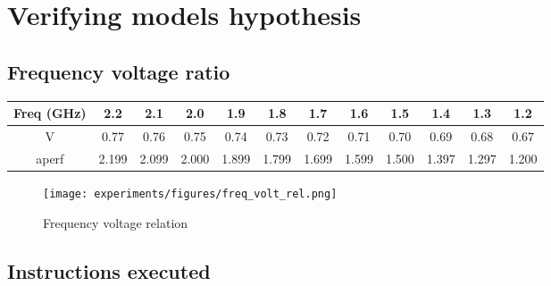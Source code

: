 \section{Verifying models hypothesis}

\subsection{Frequency voltage ratio}

\begin{table}[H]
	\begin{tabular}{|c|c|c|c|c|c|c|c|c|c|c|c|}
		\hline
		Freq (GHz) & 2.2   & 2.1   & 2.0   & 1.9   & 1.8   & 1.7   & 1.6   & 1.5   & 1.4   & 1.3   & 1.2   \\ \hline
		V          & 0.77  & 0.76  & 0.75  & 0.74  & 0.73  & 0.72  & 0.71  & 0.70  & 0.69  & 0.68  & 0.67  \\ \hline
		aperf      & 2.199 & 2.099 & 2.000 & 1.899 & 1.799 & 1.699 & 1.599 & 1.500 & 1.397 & 1.297 & 1.200 \\ \hline
	\end{tabular}
\end{table}

\begin{figure}[H]
	\centering
	\texttt{[image: experiments/figures/freq\_volt\_rel.png]}
	\caption{Frequency voltage relation}
	\label{fig:freq_volt_rel}
\end{figure}

\subsection{Instructions executed}


